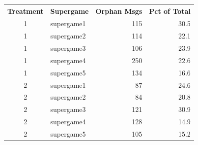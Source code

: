 \begin{tabular}{clrr}
  \toprule
  Treatment & Supergame & Orphan Msgs & Pct of Total \\ 
  \midrule
  1 & supergame1 & 115 & 30.5 \\ 
  1 & supergame2 & 114 & 22.1 \\ 
  1 & supergame3 & 106 & 23.9 \\ 
  1 & supergame4 & 250 & 22.6 \\ 
  1 & supergame5 & 134 & 16.6 \\ 
  2 & supergame1 & 87 & 24.6 \\ 
  2 & supergame2 & 84 & 20.8 \\ 
  2 & supergame3 & 121 & 30.9 \\ 
  2 & supergame4 & 128 & 14.9 \\ 
  2 & supergame5 & 105 & 15.2 \\ 
  \bottomrule
\end{tabular}
